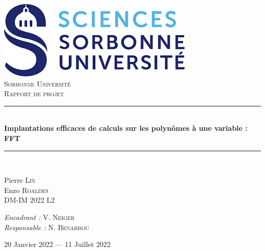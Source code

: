 \documentclass[12pt, a4paper]{article}
\newcommand{\HRule}{\rule{\linewidth}{0.5mm}}
\begin{document}
\begin{titlepage}
  \begin{sffamily}
  \begin{center}

    \includegraphics[scale=0.4]{logo.png}~\\[1.5cm]

    \textsc{\LARGE Sorbonne Université}\\[2cm]

    \textsc{\Large Rapport de projet}\\[1.5cm]

    \HRule \\[0.4cm]
    { \huge \bfseries Implantations efficaces de calculs sur les polynômes à une variable : FFT\\[0.4cm] }

    \HRule \\[4cm]

    \begin{minipage}{0.4\textwidth}
      \begin{flushleft} \large
        Pierre \textsc{Lin}\\
        Enzo \textsc{Roaldes}\\
        DM-IM 2022 L2\\
      \end{flushleft}
    \end{minipage}
    \begin{minipage}{0.4\textwidth}
      \begin{flushright} \large
        \emph{Encadrant :} V. \textsc{Neiger}\\
        \emph{Responsable :} N. \textsc{Benabbou}\\
      \end{flushright}
    \end{minipage}

    \vfill

    {\large 20 Janvier 2022 — 11 Juillet 2022}

  \end{center}
  \end{sffamily}
\end{titlepage}
\end{document}
